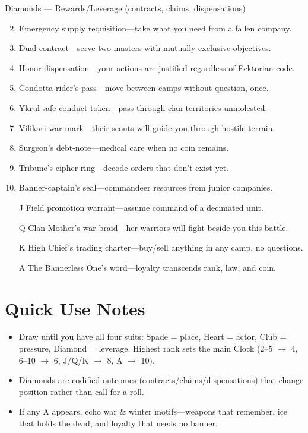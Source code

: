 Diamonds --- Rewards/Leverage (contracts, claims, dispensations)
\begin{enumerate}
\setcounter{enumi}{1}
\item Emergency supply requisition---take what you need from a fallen company.
\item Dual contract---serve two masters with mutually exclusive objectives.
\item Honor dispensation---your actions are justified regardless of Ecktorian code.
\item Condotta rider's pass---move between camps without question, once.
\item Ykrul safe-conduct token---pass through clan territories unmolested.
\item Vilikari war-mark---their scouts will guide you through hostile terrain.
\item Surgeon's debt-note---medical care when no coin remains.
\item Tribune's cipher ring---decode orders that don't exist yet.
\item Banner-captain's seal---commandeer resources from junior companies.
\item[J] Field promotion warrant---assume command of a decimated unit.
\item[Q] Clan-Mother's war-braid---her warriors will fight beside you this battle.
\item[K] High Chief's trading charter---buy/sell anything in any camp, no questions.
\item[A] The Bannerless One's word---loyalty transcends rank, law, and coin.
\end{enumerate}

\section*{Quick Use Notes}
\label{sec:black-banners-quick-use}
\begin{itemize}
\item Draw until you have all four suits: Spade = place, Heart = actor, Club = pressure, Diamond = leverage. Highest rank sets the main Clock (2--5 $\rightarrow$ 4, 6--10 $\rightarrow$ 6, J/Q/K $\rightarrow$ 8, A $\rightarrow$ 10).
\item Diamonds are codified outcomes (contracts/claims/dispensations) that change position rather than call for a roll.
\item If any A appears, echo war \& winter motifs---weapons that remember, ice that holds the dead, and loyalty that needs no banner.
\end{itemize}

